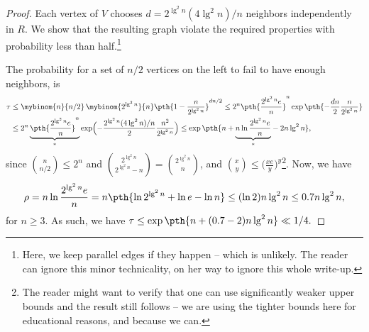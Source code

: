\begin{proof}
    Each vertex of $V$ chooses
    $\displaystyle d= 2^{\lg^2n} ( 4 \lg^2 n)/n$ neighbors
    independently in $R$. We show that the resulting graph violate the
    required properties with probability less than
    half.\footnote{Here, we keep parallel edges if they happen --
       which is unlikely. The reader can ignore this minor
       technicality, on her way to ignore this whole write-up.}
    
    The probability for a set of $n/2$ vertices on the left to fail to
    have enough neighbors, is
    \begin{align*}
      \tau%
      & \leq %
        \mybinom{n}{n/2} \, \mybinom{2^{\lg^2 n}}{n} \pth{ 1 -
        \frac{n}{2^{\lg^2 n}}}^{dn/2}%
        \leq %
        2^n \pth{\frac{2^{\lg^2 n}e}{n}}^n \exp \pth{ -
        \frac{dn}{2} \frac{n}{2^{\lg^2 n}}}%
      \\&%
      \leq%
      2^n \underbrace{\pth{\frac{2^{\lg^2 n}e}{n}}^n}_{*}%
      \exp \Bigl({ - \frac{ {2^{\lg^2n} ( 4 \lg^2 n)/n}}{2}
      \frac{n^2}{2^{\lg^2 n}}}\Bigr)%
      \leq%
      \exp \pth{\Bigl. n +
      \smash{\underbrace{n \ln {\frac{2^{\lg^2 n}e}{n}}}_{*}}
      - 2n \lg^2 n },
    \end{align*}
    since $\binom{n}{n/2} \leq 2^n$ and
    $\binom{2^{\lg^2 n}}{2^{\lg^2 n} - n} = \binom{2^{\lg^2 n}}{n}$,
    and $\binom{x}{y} \leq \bigl(\frac{xe}{y}\bigr)^y$\footnote{The
       reader might want to verify that one can use significantly
       weaker upper bounds and the result still follows -- we are
       using the tighter bounds here for educational reasons, and
       because we can.}. %
    Now, we have
    \begin{equation*}
      \rho%
      =%
      n \ln {\frac{2^{\lg^2 n}e}{n}}%
      =%
      n \pth{ \ln 2^{\lg^2 n} + \ln e - \ln n}%
      \leq
      (\ln 2 ) n \lg^2 n%
      \leq
      0.7 n \lg^2 n,        
  \end{equation*}
    for $n \geq 3$. As such, we have
    \begin{math}
        \tau \leq \exp \pth{ n + (0.7-2) n \lg^2 n}%
        \ll 1/4.
    \end{math}


\end{proof}
